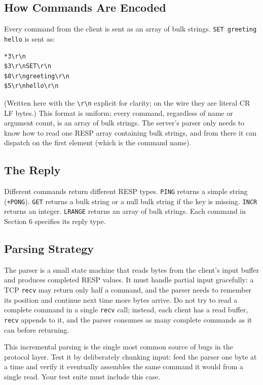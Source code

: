 \documentclass[11pt,a4paper]{article}
\begin{document}
\subsection{How Commands Are Encoded}
Every command from the client is sent as an array of bulk strings. \texttt{SET greeting hello} is sent as:

\begin{codebox}
\begin{lstlisting}
*3\r\n
$3\r\nSET\r\n
$8\r\ngreeting\r\n
$5\r\nhello\r\n
\end{lstlisting}
\end{codebox}

(Written here with the \verb|\r\n| explicit for clarity; on the wire they are literal CR LF bytes.) This format is uniform: every command, regardless of name or argument count, is an array of bulk strings. The server's parser only needs to know how to read one RESP array containing bulk strings, and from there it can dispatch on the first element (which is the command name).

\subsection{The Reply}
Different commands return different RESP types. \texttt{PING} returns a simple string (\texttt{+PONG}). \texttt{GET} returns a bulk string or a null bulk string if the key is missing. \texttt{INCR} returns an integer. \texttt{LRANGE} returns an array of bulk strings. Each command in Section 6 specifies its reply type.

\subsection{Parsing Strategy}
The parser is a small state machine that reads bytes from the client's input buffer and produces completed RESP values. It must handle partial input gracefully: a TCP \texttt{recv} may return only half a command, and the parser needs to remember its position and continue next time more bytes arrive. Do not try to read a complete command in a single \texttt{recv} call; instead, each client has a read buffer, \texttt{recv} appends to it, and the parser consumes as many complete commands as it can before returning.

This incremental parsing is the single most common source of bugs in the protocol layer. Test it by deliberately chunking input: feed the parser one byte at a time and verify it eventually assembles the same command it would from a single read. Your test suite must include this case.
\end{document}
